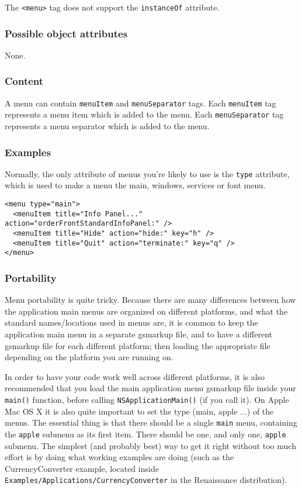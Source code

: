 The \texttt{<menu>} tag does not support the \texttt{instanceOf} attribute.

\subsubsection{Possible object attributes}
None.

\subsubsection{Content}
A menu can contain \texttt{menuItem} and \texttt{menuSeparator} tags.
Each \texttt{menuItem} tag represents a menu item which is added to
the menu.  Each \texttt{menuSeparator} tag represents a menu separator
which is added to the menu.

\subsubsection{Examples}
Normally, the only attribute of menus you're likely to use is the 
\texttt{type} attribute, which is used to make a menu the main, windows, 
services or font menu.
\begin{verbatim}
<menu type="main">
  <menuItem title="Info Panel..." action="orderFrontStandardInfoPanel:" />
  <menuItem title="Hide" action="hide:" key="h" />
  <menuItem title="Quit" action="terminate:" key="q" />
</menu>
\end{verbatim}

\subsubsection{Portability}
Menu portability is quite tricky.  Because there are many differences
between how the application main menus are organized on different
platforms, and what the standard names/locations used in menus are, it
is common to keep the application main menu in a separate gsmarkup
file, and to have a different gsmarkup file for each different
platform; then loading the appropriate file depending on the platform
you are running on.

In order to have your code work well across different platforms, it is
also recommended that you load the main application menu gsmarkup file
inside your \texttt{main()} function, before calling
\texttt{NSApplicationMain()} (if you call it).  On Apple Mac OS X it is
also quite important to set the type (main, apple ...)  of the menus.
The essential thing is that there should be a single \texttt{main}
menu, containing the \texttt{apple} submenu as its first item.  There
should be one, and only one, \texttt{apple} submenu.  The simplest
(and probably best) way to get it right without too much effort is by
doing what working examples are doing (such as the CurrencyConverter
example, located inside
\texttt{Examples/Applications/CurrencyConverter} in the Renaissance
distribution).

